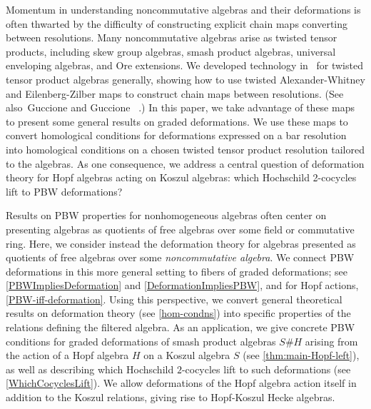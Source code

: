 \documentclass[11pt]{amsart}
\numberwithin{equation}{section}
\renewcommand{\_}[1]{\mbox{$_{\left( #1 \right)}$}}
\begin{document}
Momentum in understanding
noncommutative algebras and their deformations is often thwarted by the difficulty of constructing explicit 
chain maps converting between resolutions.
Many noncommutative algebras arise as twisted tensor products,
including
skew group algebras, smash product algebras, universal enveloping
algebras, and Ore extensions. 
We developed technology in~\cite{TTP-AWEZ} for twisted tensor product algebras
generally, showing how to use twisted 
Alexander-Whitney and Eilenberg-Zilber maps to construct
chain maps between resolutions.
(See also~Guccione and Guccione ~\cite{GG}.)
In this paper, we take advantage of these maps to  
present some general results on graded deformations.
We use these maps to convert homological conditions for deformations
expressed on a bar resolution
into homological conditions on a chosen
twisted tensor product resolution tailored to the algebras.
As one consequence, we address a central question of
deformation theory for Hopf algebras acting on Koszul algebras:
which Hochschild 2-cocycles lift to PBW deformations?

Results on PBW properties for nonhomogeneous algebras
 often center on presenting algebras as quotients of free algebras
 over some field or commutative ring.
 Here, we consider instead the deformation theory for 
 algebras presented as quotients of free algebras over some
 {\em noncommutative algebra}.
 We connect PBW deformations in this more general setting
 to fibers of graded deformations;
 see \cref{PBWImpliesDeformation} and \cref{DeformationImpliesPBW},
 and for Hopf actions, \cref{PBW-iff-deformation}.
 Using this perspective, we convert general theoretical results
 on deformation theory
 (see \cref{hom-condns})
 into specific properties of the relations
defining the filtered algebra. 
As an application, we give concrete PBW conditions
for graded deformations of smash product algebras $S\# H$ arising from the action of
 a Hopf algebra $H$ on a Koszul algebra $S$ (see \cref{thm:main-Hopf-left}),
as well as describing which
Hochschild $2$-cocycles lift to such deformations
(see \cref{WhichCocyclesLift}).
We allow deformations of the Hopf algebra action itself in addition to 
the Koszul relations,
giving rise to Hopf-Koszul Hecke algebras.
\end{document}
